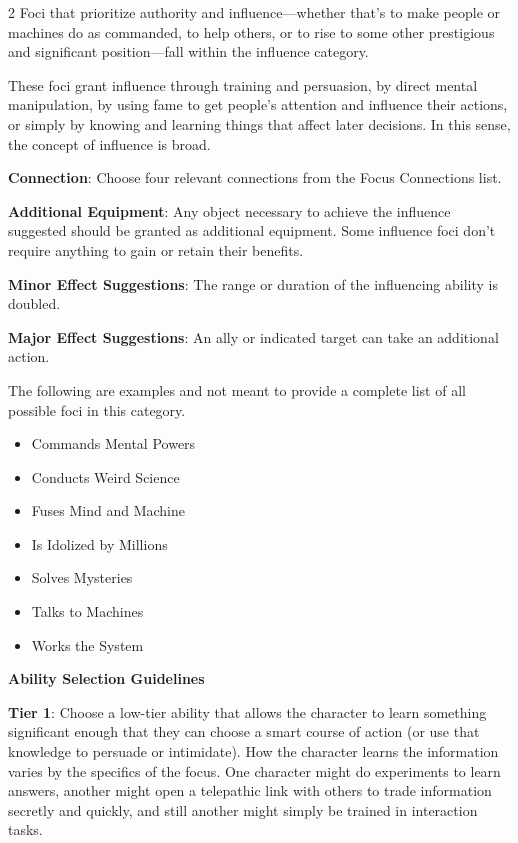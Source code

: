 \begin{multicols}{2}
Foci that prioritize authority and influence—whether that’s to make people or machines do as commanded, to help others, or to rise to some other prestigious and significant position—fall within the influence category. 

These foci grant influence through training and persuasion, by direct mental manipulation, by using fame to get people’s attention and influence their actions, or simply by knowing and learning things that affect later decisions. In this sense, the concept of influence is broad.

\textbf{Connection}: Choose four relevant connections from the Focus Connections list. 

\textbf{Additional Equipment}: Any object necessary to achieve the influence suggested should be granted as additional equipment. Some influence foci don’t require anything to gain or retain their benefits.

\textbf{Minor Effect Suggestions}: The range or duration of the influencing ability is doubled. 

\textbf{Major Effect Suggestions}: An ally or indicated target can take an additional action.

The following are examples and not meant to provide a complete list of all possible foci in this category.

\begin{itemize} 
\item Commands Mental Powers
\item Conducts Weird Science
\item Fuses Mind and Machine
\item Is Idolized by Millions
\item Solves Mysteries
\item Talks to Machines
\item Works the System
\end{itemize}

\textbf{Ability Selection Guidelines}

\textbf{Tier 1}: Choose a low-tier ability that allows the character to learn something significant enough that they can choose a smart course of action (or use that knowledge to persuade or intimidate). How the character learns the information varies by the specifics of the focus. One character might do experiments to learn answers, another might open a telepathic link with others to trade information secretly and quickly, and still another might simply be trained in interaction tasks.


\end{multicols}
